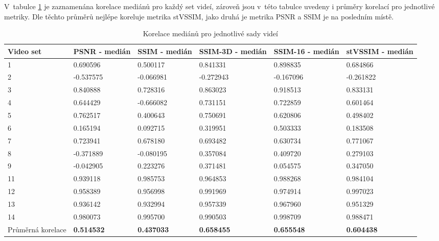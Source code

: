 \documentclass[thesis=M,czech]{FITthesis}[2016/06/26]
\begin{document}
V~tabulce \ref{tab:korelace_med} je zaznamenána korelace mediánů pro každý set videí, zároveň jsou v~této tabulce uvedeny i průměry korelací pro jednotlivé metriky. Dle těchto průměrů nejlépe koreluje metrika stVSSIM, jako druhá je metrika PSNR a SSIM je na posledním místě. 
\begin{table}[]
\centering
\begin{tabular}{|p{1.5cm}|p{1.8cm}|p{1.8cm}|p{1.9cm}|p{1.9cm}|p{1.9cm}|}
\hline
Video set         & PSNR - \newline medián & SSIM - \newline medián & SSIM-3D - medián & SSIM-16 - medián & stVSSIM - medián \\ \hline
1                 & 0.690596      & 0.500117      & 0.841331         & 0.898835         & 0.684866         \\ \hline
2                 & -0.537575     & -0.066981     & -0.272943        & -0.167096        & -0.261822        \\ \hline
3                 & 0.840888      & 0.728316      & 0.863023         & 0.918513         & 0.833131         \\ \hline
4                 & 0.644429      & -0.666082     & 0.731151         & 0.722859         & 0.601464         \\ \hline
5                 & 0.762517      & 0.400643      & 0.750691         & 0.620806         & 0.498402         \\ \hline
6                 & 0.165194      & 0.092715      & 0.319951         & 0.503333         & 0.183508         \\ \hline
7                 & 0.723941      & 0.678180      & 0.693482         & 0.630734         & 0.771067         \\ \hline
8                 & -0.371889     & -0.080195     & 0.357084         & 0.409720         & 0.279103         \\ \hline
9                 & -0.042905     & 0.223276      & 0.371481         & 0.054575         & 0.347050         \\ \hline
11                & 0.939118      & 0.985753      & 0.964853         & 0.988268         & 0.984104         \\ \hline
12                & 0.958389      & 0.956998      & 0.991969         & 0.974914         & 0.997023         \\ \hline
13                & 0.936142      & 0.932994      & 0.957339         & 0.967960         & 0.951329         \\ \hline
14                & 0.980073      & 0.995700      & 0.990503         & 0.998709         & 0.988471         \\ \hline \hline
Průměrná korelace & \textbf{0.514532}      & \textbf{0.437033}      & \textbf{0.658455}         & \textbf{0.655548}         & \textbf{0.604438}         \\ \hline
\end{tabular}
\caption{Korelace mediánů pro jednotlivé sady videí} \label{tab:korelace_med}
\end{table}
\end{document}
